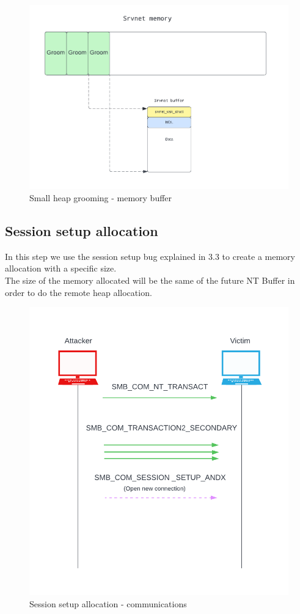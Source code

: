 \begin{figure}[ht!]
    \centering
      \includegraphics[scale=0.5]{images/exploit_1_buff.png}
      \caption{Small heap grooming - memory buffer}
\end{figure}


\clearpage
\subsection{Session setup allocation}
In this step we use the session setup bug explained in 3.3 to create a memory allocation with a specific size.\\
The size of the memory allocated will be the same of the future NT Buffer in order to do the remote heap allocation.\\

\begin{figure}[ht!]
    \centering
      \includegraphics[scale=0.5]{images/exploit_2_comm.png}
      \caption{Session setup allocation - communications}
\end{figure}

